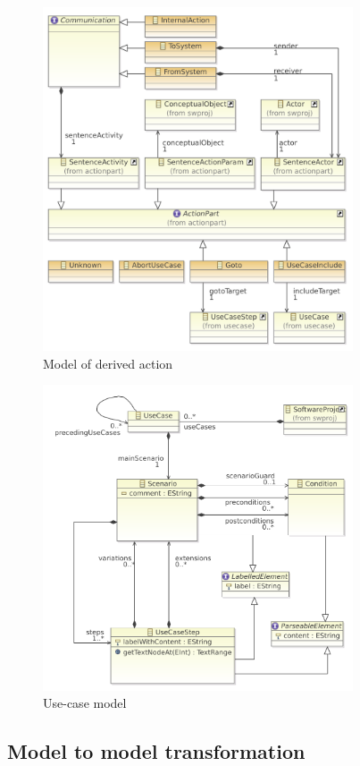 \begin{figure}
  \centering
  \includegraphics[width=260pt]{images/ReprotoolActionsModel}
  \caption{Model of derived action}
  \label{fig:ReprotoolActionsModel}
\end{figure}

\begin{figure}
  \centering
  \includegraphics[width=260pt]{images/ReprotoolUCModel}
  \caption{Use-case model}
  \label{fig:ReprotoolUCModel}
\end{figure}



\subsection{Model to model transformation}

